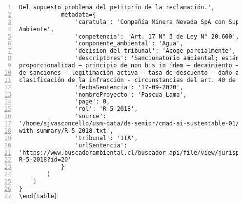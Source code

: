 \begin{Verbatim}[frame=lines, label=Elavoración propia -  Ejemplo de Contexto enviado por el Chatbot a OpenAI
				, fontsize=\footnotesize, numbers=left
				, baselinestretch=0.4
				, formatcom=\color{gray}]
Del supuesto problema del petitorio de la reclamación.',
            metadata={
                'caratula': 'Compañía Minera Nevada SpA con Superintendencia del Medio
Ambiente',
                'competencia': 'Art. 17 N° 3 de Ley N° 20.600',
                'componente_ambiental': 'Agua',
                'decision_del_tribunal': 'Acoge parcialmente',
                'descriptores': 'Sancionatorio ambiental; estándar de motivación –
proporcionalidad – principio de non bis in ídem – decaimiento – metodología de determinación
de sanciones – legitimación activa – tasa de descuento – daño ambiental – impacto ambiental –
clasificación de la infracción - circunstancias del art. 40 de la Ley N° 20.417',
                'fechaSentencia': '17-09-2020',
                'nombreProyecto': 'Pascua Lama',
                'page': 0,
                'rol': 'R-5-2018',
                'source':
'/home/sjvasconcello/usm-data/ds-senior/cmad-ai-sustentable-01/etl/load/../../data/clean/docs_
with_summary/R-5-2018.txt',
                'tribunal': '1TA',
                'urlSentencia':
'https://www.buscadorambiental.cl/buscador-api/file/view/jurisprudencia/S1TA Rol N°
R-5-2018?id=20'
            }
        )
    ]
}
\end{table}
\end{Verbatim}


